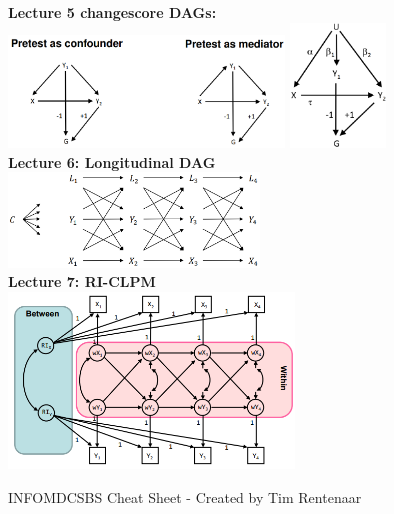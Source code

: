 \documentclass[a4paper,7pt,landscape]{extarticle}
\begin{document}
\begin{multicols}{3}
\begin{boxA}
\centering
\textbf{Lecture 5 changescore DAGs:}\\
    \includegraphics[width=0.55\textwidth]{changescoredag.png} \hfill \includegraphics[width=0.19\textwidth]{unobservedconfounder_changescoredag.png}\\
\textbf{Lecture 6: Longitudinal DAG}\\
    \includegraphics[width=0.5\textwidth]{jointtreatment.png}\\
\textbf{Lecture 7: RI-CLPM}\\
    \includegraphics[width=0.57\textwidth]{riclpm.png}
\end{boxA}


INFOMDCSBS Cheat Sheet - Created by Tim Rentenaar

\end{multicols}
\end{document}
